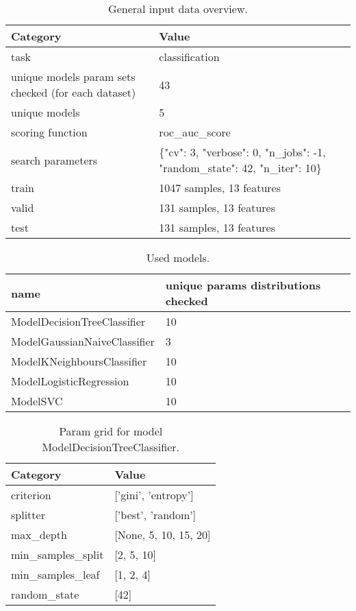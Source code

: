 \documentclass{article}%
\begin{document}
\begin{table}[H]%
\begin{center}%
\begin{tabular}{p{40mm} p{120mm}}%
\hline%
\textbf{Category}&\textbf{Value}\\%
\hline%
task&classification\\%
unique models param sets checked (for each dataset)&43\\%
unique models&5\\%
scoring function&roc\_auc\_score\\%
search parameters&\{"cv": 3, "verbose": 0, "n\_jobs": {-}1, "random\_state": 42, "n\_iter": 10\}\\%
train&1047 samples, 13 features\\%
valid&131 samples, 13 features\\%
test&131 samples, 13 features\\%
\hline%
\end{tabular}%
\end{center}%
\caption{General input data overview.}%
\end{table}

%


\begin{table}[H]%
\begin{center}%
\begin{tabular}{l l}%
\hline%
\textbf{name}&\textbf{unique params distributions checked}\\%
\hline%
ModelDecisionTreeClassifier&10\\%
ModelGaussianNaiveClassifier&3\\%
ModelKNeighboursClassifier&10\\%
ModelLogisticRegression&10\\%
ModelSVC&10\\%
\hline%
\end{tabular}%
\end{center}%
\caption{Used models.}%
\end{table}

%


\begin{table}[H]%
\begin{center}%
\begin{tabular}{l l}%
\hline%
\textbf{Category}&\textbf{Value}\\%
\hline%
criterion&{[}'gini', 'entropy'{]}\\%
splitter&{[}'best', 'random'{]}\\%
max\_depth&{[}None, 5, 10, 15, 20{]}\\%
min\_samples\_split&{[}2, 5, 10{]}\\%
min\_samples\_leaf&{[}1, 2, 4{]}\\%
random\_state&{[}42{]}\\%
\hline%
\end{tabular}%
\end{center}%
\caption{Param grid for model ModelDecisionTreeClassifier.}%
\end{table}
\end{document}
